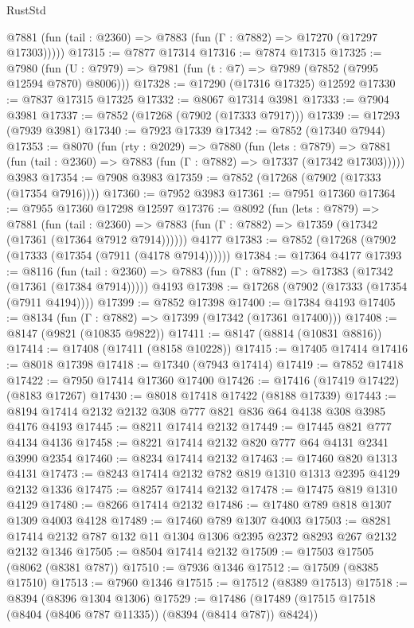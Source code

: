 \begin{lexlean}{RustStd}
\begin{coremodule}
      @7881 (fun (tail : @2360) => @7883 (fun (Γ : @7882) => @17270 (@17297 @17303)))))
@17315 := @7877 @17314
@17316 := @7874 @17315
@17325 := @7980
    (fun (U : @7979) => @7981 (fun (t : @7) => @7989 (@7852 (@7995 @12594 @7870) @8006)))
@17328 := @17290 (@17316 @17325) @12592
@17330 := @7837 @17315 @17325
@17332 := @8067 @17314 @3981
@17333 := @7904 @3981
@17337 := @7852 (@17268 (@7902 (@17333 @7917)))
@17339 := @17293 (@7939 @3981)
@17340 := @7923 @17339
@17342 := @7852 (@17340 @7944)
@17353 := @8070
    (fun (rty : @2029) =>
    @7880
      (fun (lets : @7879) =>
      @7881 (fun (tail : @2360) => @7883 (fun (Γ : @7882) => @17337 (@17342 @17303)))))
    @3983
@17354 := @7908 @3983
@17359 := @7852 (@17268 (@7902 (@17333 (@17354 @7916))))
@17360 := @7952 @3983
@17361 := @7951 @17360
@17364 := @7955 @17360 @17298 @12597
@17376 := @8092
    (fun (lets : @7879) =>
    @7881
      (fun (tail : @2360) =>
      @7883 (fun (Γ : @7882) => @17359 (@17342 (@17361 (@17364 @7912 @7914))))))
    @4177
@17383 := @7852 (@17268 (@7902 (@17333 (@17354 (@7911 (@4178 @7914))))))
@17384 := @17364 @4177
@17393 := @8116
    (fun (tail : @2360) => @7883 (fun (Γ : @7882) => @17383 (@17342 (@17361 (@17384 @7914)))))
    @4193
@17398 := @17268 (@7902 (@17333 (@17354 (@7911 @4194))))
@17399 := @7852 @17398
@17400 := @17384 @4193
@17405 := @8134 (fun (Γ : @7882) => @17399 (@17342 (@17361 @17400)))
@17408 := @8147 (@9821 (@10835 @9822))
@17411 := @8147 (@8814 (@10831 @8816))
@17414 := @17408 (@17411 (@8158 @10228))
@17415 := @17405 @17414
@17416 := @8018 @17398
@17418 := @17340 (@7943 @17414)
@17419 := @7852 @17418
@17422 := @7950 @17414 @17360 @17400
@17426 := @17416 (@17419 @17422) (@8183 @17267)
@17430 := @8018 @17418 @17422 (@8188 @17339)
@17443 := @8194 @17414 @2132 @2132 @308 @777 @821 @836 @64 @4138 @308 @3985 @4176 @4193
@17445 := @8211 @17414 @2132
@17449 := @17445 @821 @777 @4134 @4136
@17458 := @8221 @17414 @2132 @820 @777 @64 @4131 @2341 @3990 @2354
@17460 := @8234 @17414 @2132
@17463 := @17460 @820 @1313 @4131
@17473 := @8243 @17414 @2132 @782 @819 @1310 @1313 @2395 @4129 @2132 @1336
@17475 := @8257 @17414 @2132
@17478 := @17475 @819 @1310 @4129
@17480 := @8266 @17414 @2132
@17486 := @17480 @789 @818 @1307 @1309 @4003 @4128
@17489 := @17460 @789 @1307 @4003
@17503 := @8281 @17414 @2132 @787 @132 @11 @1304 @1306 @2395 @2372 @8293 @267 @2132 @2132 @1346
@17505 := @8504 @17414 @2132
@17509 := @17503 @17505 (@8062 (@8381 @787))
@17510 := @7936 @1346
@17512 := @17509 (@8385 @17510)
@17513 := @7960 @1346
@17515 := @17512 (@8389 @17513)
@17518 := @8394 (@8396 @1304 @1306)
@17529 := @17486 (@17489 (@17515 @17518 (@8404 (@8406 @787 @11335)) (@8394 (@8414 @787)) @8424))

\end{coremodule}
\end{lexlean}
